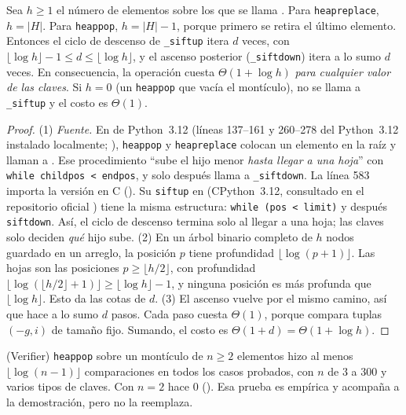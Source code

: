 \begin{lema}\label{lem:heapq}
Sea $h\ge1$ el número de elementos sobre los que se llama . Para \texttt{heapreplace}, $h=|H|$. Para \texttt{heappop}, $h=|H|-1$, porque primero se retira el último elemento. Entonces el ciclo de descenso de \texttt{\_siftup} itera $d$ veces, con $\lfloor\log h\rfloor-1\le d\le\lfloor\log h\rfloor$, y el ascenso posterior (\texttt{\_siftdown}) itera a lo sumo $d$ veces. En consecuencia, la operación cuesta $\Theta(1+\log h)$ \emph{para cualquier valor de las claves}. Si $h=0$ (un \texttt{heappop} que vacía el montículo), no se llama a \texttt{\_siftup} y el costo es $\Theta(1)$.
\end{lema}
\begin{proof}
(1) \emph{Fuente.} En  de Python~3.12 (líneas 137–161 y 260–278 del Python~3.12 instalado localmente; \cite{cpython_heapq}), \texttt{heappop} y \texttt{heapreplace} colocan un elemento en la raíz y llaman a . Ese procedimiento ``sube el hijo menor \emph{hasta llegar a una hoja}'' con \texttt{while childpos < endpos}, y solo después llama a \texttt{\_siftdown}. La línea 583 importa la versión en C (). Su \texttt{siftup} en  (CPython~3.12, consultado en el repositorio oficial \cite{cpython_heapq}) tiene la misma estructura: \texttt{while (pos < limit)} y después \texttt{siftdown}. Así, el ciclo de descenso termina solo al llegar a una hoja; las claves solo deciden \emph{qué} hijo sube.
(2) En un árbol binario completo de $h$ nodos guardado en un arreglo, la posición $p$ tiene profundidad $\lfloor\log(p+1)\rfloor$. Las hojas son las posiciones $p\ge\lfloor h/2\rfloor$, con profundidad $\lfloor\log(\lfloor h/2\rfloor+1)\rfloor\ge\lfloor\log h\rfloor-1$, y ninguna posición es más profunda que $\lfloor\log h\rfloor$. Esto da las cotas de $d$.
(3) El ascenso vuelve por el mismo camino, así que hace a lo sumo $d$ pasos. Cada paso cuesta $\Theta(1)$, porque compara tuplas $(-g,i)$ de tamaño fijo. Sumando, el costo es $\Theta(1+d)=\Theta(1+\log h)$.
\end{proof}
\noindent(Verifier) \texttt{heappop} sobre un montículo de $n\ge2$ elementos hizo al menos $\lfloor\log(n-1)\rfloor$ comparaciones en todos los casos probados, con $n$ de $3$ a $300$ y varios tipos de claves. Con $n=2$ hace $0$ (). Esa prueba es empírica y acompaña a la demostración, pero no la reemplaza.


